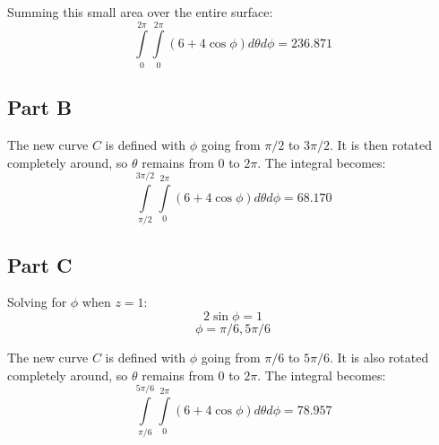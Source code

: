 \documentclass{article}
\begin{document}
Summing this small area over the entire surface:
$$\int\limits_0^{2 \pi} \int\limits_0^{2 \pi} (6 + 4 \cos \phi) d\theta d\phi =
236.871 $$

\subsection*{Part B}

The new curve $C$ is defined with $\phi$ going from $\pi/2$ to $3\pi/2$. It is
then rotated completely around, so $\theta$ remains from $0$ to $2 \pi$. The
integral becomes:
$$ \int\limits_{\pi/2}^{3 \pi/ 2} \int\limits_0^{2 \pi} (6 + 4 \cos \phi)
d\theta d\phi = 68.170 $$

\subsection*{Part C}

Solving for $\phi$ when $z = 1$:
$$ 2 \sin \phi = 1 $$
$$ \phi = \pi/6, 5\pi/6 $$

The new curve $C$ is defined with $\phi$ going from $\pi/6$ to $5\pi/6$. It is
also rotated completely around, so $\theta$ remains from $0$ to $2 \pi$. The
integral becomes:
$$ \int\limits_{\pi/6}^{5\pi/6} \int\limits_0^{2 \pi} (6 + 4 \cos \phi) d\theta
d\phi = 78.957 $$
\end{document}
